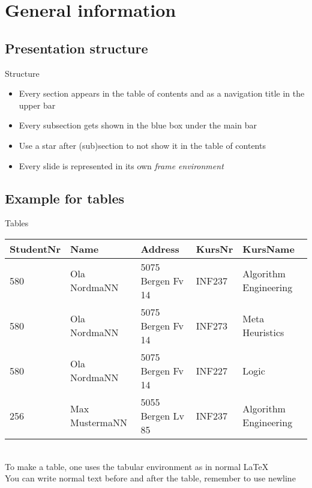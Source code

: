 \section{General information}
\subsection*{Presentation structure}
\begin{frame}{Structure}
\begin{itemize}
    \item Every section appears in the table of contents and as a navigation title in the upper bar
    \item Every subsection gets shown in the blue box under the main bar
    \item Use a star after (sub)section to not show it in the table of contents
    \item Every slide is represented in its own \textit{frame environment}
\end{itemize}
\end{frame}

\subsection*{Example for tables}
\begin{frame}{Tables}
\begin{tabular}{l|l|l|l|l}
 StudentNr & Name & Address & KursNr & KursName \\\hline
 580 & Ola NordmaNN & 5075 Bergen Fv 14 & INF237 & Algorithm Engineering\\
 580 & Ola NordmaNN & 5075 Bergen Fv 14 & INF273 & Meta Heuristics\\
 580 & Ola NordmaNN & 5075 Bergen Fv 14 & INF227 & Logic\\
 256 & Max MustermaNN & 5055 Bergen Lv 85 & INF237 & Algorithm Engineering\\
\end{tabular}
\\[5mm] %
To make a table, one uses the tabular environment as in normal \LaTeX\\
You can write normal text before and after the table, remember to use newline
\end{frame}

